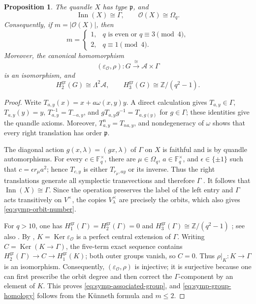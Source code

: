 \documentclass[11pt]{article}
\newtheorem{proposition}[theorem]{Proposition}
\DeclareMathOperator{\Inn}{Inn}
\DeclareMathOperator{\Ker}{Ker}
\newcommand{\ZZ}{\mathbb Z}
\newcommand{\OO}{\mathcal O}
\newcommand{\gr}{\mathrm{gr}}
\begin{document}
\begin{proposition}
\label{prop:symp-associated-group}
The quandle $X$ has type $\mathfrak p$, and
\[
 \Inn(X)\cong\Gamma,
 \qquad
 \OO(X)\cong\Omega_q.
\]
Consequently, if $m=|\OO(X)|$, then
\begin{equation}
 m=
 \begin{cases}
 1,&q\text{ is even or }q\equiv3\pmod4,\\
 2,&q\equiv1\pmod4.
 \end{cases}
\label{eq:symp-orbit-number}
\end{equation}
Moreover, the canonical homomorphism
\begin{equation}
 (\varepsilon_{\OO},\rho)\colon
 G\xrightarrow{\cong}\mathcal A\times\Gamma
\label{eq:symp-associated-group}
\end{equation}
is an isomorphism, and
\begin{equation}
 H_2^{\gr}(G)\cong\Lambda^2\mathcal A,
 \qquad
 H_3^{\gr}(G)\cong\ZZ/(q^2-1).
\label{eq:symp-group-homology}
\end{equation}
\end{proposition}

\begin{proof}
Write $T_{a,y}(x)=x+a\omega(x,y)y$. A direct calculation gives
$T_{a,y}\in\Gamma$, $T_{a,y}(y)=y$, $T_{a,y}^{-1}=T_{-a,y}$, and
$gT_{a,y}g^{-1}=T_{a,g(y)}$ for $g\in\Gamma$; these identities give the
quandle axioms. Moreover, $T_{a,y}^n=T_{na,y}$, and nondegeneracy of
$\omega$ shows that every right translation has order $\mathfrak p$.

The diagonal action $g(x,\lambda)=(gx,\lambda)$ of $\Gamma$ on $X$ is
faithful and is by quandle automorphisms. For every
$c\in\mathbb F_q^\times$, there are $\mu\in\Omega_q$,
$a\in\mathbb F_q^\times$, and $\epsilon\in\{\pm1\}$ such that
$c=\epsilon r_\mu a^2$; hence $T_{c,y}$ is either $T_{r_\mu,ay}$ or its
inverse. Thus the right translations generate all symplectic transvections
and therefore $\Gamma$ \cite[Lemma~4.3]{NosakaAdjoint}. It follows that
$\Inn(X)\cong\Gamma$. Since the operation preserves the label of the left
entry and $\Gamma$ acts transitively on $V^\times$, the copies
$V_\lambda^\times$ are precisely the orbits, which also gives
\eqref{eq:symp-orbit-number}.

For $q>10$, one has
$H_1^{\gr}(\Gamma)=H_2^{\gr}(\Gamma)=0$ and
$H_3^{\gr}(\Gamma)\cong\ZZ/(q^2-1)$
\cite[Proposition~4.6 and its proof]{NosakaAdjoint}; see also
\cite{FiedorowiczPriddy,Friedlander}. By
\cite[Proposition~3.3]{NosakaAdjoint},
$K=\Ker\varepsilon_{\OO}$ is a perfect central extension of $\Gamma$.
Writing $C=\Ker(K\to\Gamma)$, the five-term exact sequence contains
$H_2^{\gr}(\Gamma)\to C\to H_1^{\gr}(K)$; both outer groups vanish, so
$C=0$. Thus $\rho|_K\colon K\to\Gamma$ is an isomorphism. Consequently,
$(\varepsilon_{\OO},\rho)$ is injective; it is surjective because one can
first prescribe the orbit degree and then correct the $\Gamma$-component by
an element of $K$. This proves \eqref{eq:symp-associated-group}, and
\eqref{eq:symp-group-homology} follows from the K\"unneth formula and
$m\le2$.
\end{proof}
\end{document}
